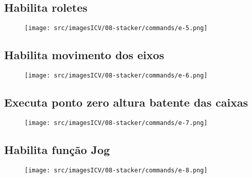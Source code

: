 \newpage
\thispagestyle{fancy}
\vspace*{40 pt}
\subsection{\small Habilita roletes}
\vspace*{\fill}
\begin{figure}[h]
    \centering
    \texttt{[image: src/imagesICV/08-stacker/commands/e-5.png]}
\end{figure}
\vspace*{\fill}

\newpage
\thispagestyle{fancy}
\vspace*{40 pt}
\subsection{\small Habilita movimento dos eixos}
\vspace*{\fill}
\begin{figure}[h]
    \centering
    \texttt{[image: src/imagesICV/08-stacker/commands/e-6.png]}
\end{figure}
\vspace*{\fill}

\newpage
\thispagestyle{fancy}
\vspace*{40 pt}
\subsection{\small Executa ponto zero altura batente das caixas}
\vspace*{\fill}
\begin{figure}[h]
    \centering
    \texttt{[image: src/imagesICV/08-stacker/commands/e-7.png]}
\end{figure}
\vspace*{\fill}

\newpage
\thispagestyle{fancy}
\vspace*{40 pt}
\subsection{\small Habilita função Jog}
\vspace*{\fill}
\begin{figure}[h]
    \centering
    \texttt{[image: src/imagesICV/08-stacker/commands/e-8.png]}
\end{figure}
\vspace*{\fill}

